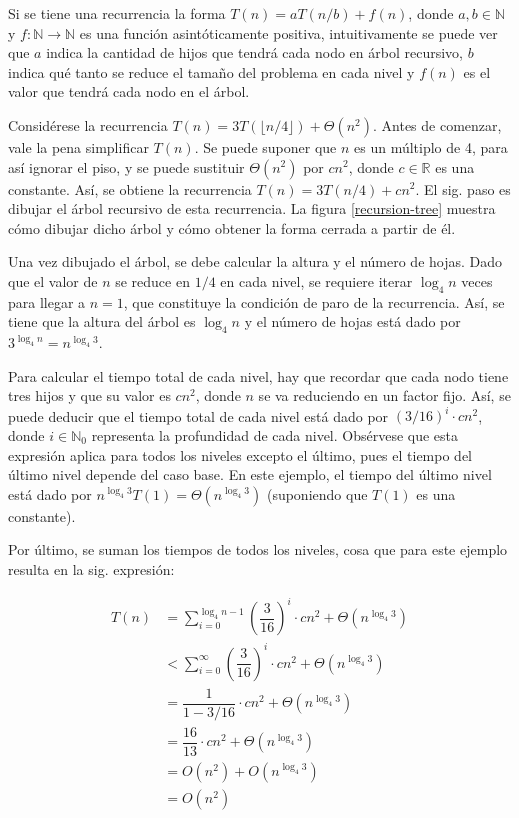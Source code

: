 Si se tiene una recurrencia la forma $T(n)=aT(n/b)+f(n)$, donde $a,b\in\mathbb{N}$ y 
$f:\mathbb{N}\to\mathbb{N}$ es una función asintóticamente 
positiva, intuitivamente se puede ver que $a$ indica 
la cantidad de hijos que tendrá cada nodo en árbol recursivo, $b$ indica qué tanto se reduce 
el tamaño del problema en cada nivel y $f(n)$ es el valor que tendrá cada nodo en el árbol.

\begin{expl}
    Considérese la recurrencia $T(n)=3T(\lfloor n/4 \rfloor)+\Theta(n^2)$. 
    Antes de comenzar, vale la pena simplificar $T(n)$. Se
    puede suponer que $n$ es un múltiplo de 4, para así ignorar el piso, y se puede 
    sustituir $\Theta(n^2)$ por $cn^2$, donde $c\in\mathbb{R}$ es 
    una constante. Así, se obtiene la recurrencia $T(n)=3T(n/4)+cn^2$. 
    El sig. paso es dibujar el árbol recursivo de esta recurrencia. La figura 
    \ref{recursion-tree} muestra cómo dibujar dicho árbol y cómo obtener la forma cerrada a 
    partir de él.
    
    Una vez dibujado el árbol, se debe calcular la altura y el número de hojas. 
    Dado que el valor de $n$ se reduce en $1/4$ en cada nivel, se requiere iterar 
    $\log_4{n}$ veces para llegar a $n=1$, que constituye la condición de paro de la 
    recurrencia. Así, se tiene que la altura del árbol es $\log_4{n}$ y el número de 
    hojas está dado por $3^{\log_{4}{n}}=n^{\log_{4}{3}}$.
    
    Para calcular el tiempo total de cada nivel, hay que recordar que cada nodo tiene
    tres hijos y que su valor es $cn^2$, donde $n$ se va reduciendo en un factor fijo. 
    Así, se puede deducir que el tiempo total 
    de cada nivel está dado por $(3/16)^i\cdot cn^2$, donde $i\in\mathbb{N}_0$
    representa la profundidad de cada nivel. Obsérvese que esta expresión aplica para todos 
    los niveles excepto el último, pues el tiempo del último nivel depende del caso base. 
    En este ejemplo, el tiempo del último nivel está dado por
    $n^{\log_{4}{3}}T(1)=\Theta(n^{\log_{4}3})$ (suponiendo que $T(1)$ es una constante).
    
    Por último, se suman los tiempos de todos los niveles, cosa que para este ejemplo 
    resulta en la sig. expresión:
    
    \begin{align*}
        T(n)&=\sum_{i=0}^{\log_{4}n-1}\left(\dfrac{3}{16}\right)^{i}\cdot cn^{2}+\Theta(n^{\log_{4}3}) \\
    	&<\sum_{i=0}^{\infty}\left(\dfrac{3}{16}\right)^{i}\cdot cn^{2}+\Theta(n^{\log_{4}3}) \\
    	&=\dfrac{1}{1-3/16}\cdot cn^{2}+\Theta(n^{\log_{4}3}) \\
    	&=\dfrac{16}{13}\cdot cn^{2}+\Theta(n^{\log_{4}3}) \\
    	&=O(n^{2})+O(n^{\log_{4}3}) \\
    	&=O(n^{2})
	\end{align*}
	\exend
\end{expl}

